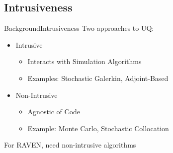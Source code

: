 \documentclass{beamer}
\begin{document}
\subsection{Intrusiveness}
\begin{frame}{Background}{Intrusiveness}\vspace{-20pt}
  Two approaches to UQ:\vspace{10pt}
  \begin{itemize}
    \item Intrusive
       \begin{itemize}
         \item Interacts with Simulation Algorithms
         \item Examples: Stochastic Galerkin, Adjoint-Based
       \end{itemize}
    \item Non-Intrusive
      \begin{itemize}
        \item Agnostic of Code
        \item Example: Monte Carlo, Stochastic Collocation
      \end{itemize}
  \end{itemize}\vspace{10pt}
  For RAVEN, need non-intrusive algorithms
\end{frame}
\end{document}
